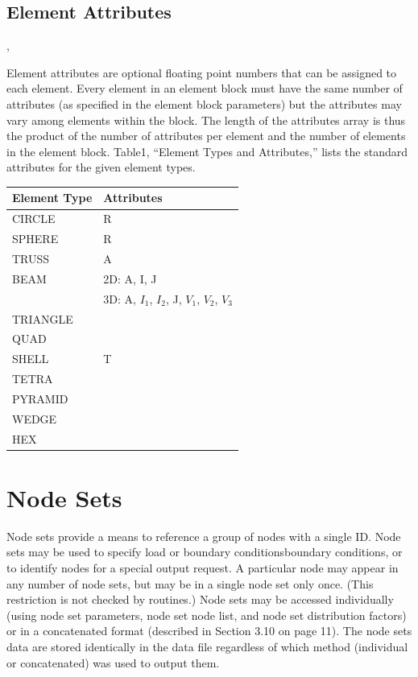 \subsection{Element Attributes}

\begin{spacing}{1.5}
\api {}, 
\end{spacing}

{Element attributes are optional floating point numbers that can be
assigned to each element. Every element in an element block must have
the same number of attributes (as specified in the element block
parameters) but the attributes may vary among elements within the
block. The length of the attributes array is thus the product of the
number of attributes per element and the number of elements in the
element block.  Table{\nobreakspace}1, ``Element Types and
Attributes,'' lists the standard attributes for the given element
types. }

\begin{table}[htbp]
\begin{center}
\begin{tabular}{|l|l|} \hline
Element Type & Attributes \\ \hline
CIRCLE   & R \\ \hline
SPHERE   & R \\ \hline
TRUSS    & A \\ \hline
BEAM     & 2D: A, I, J \\
         & 3D: A, $I_1$, $I_2$, J, $V_1$, $V_2$, $V_3$ \\ \hline
TRIANGLE & \\ \hline
QUAD     & \\ \hline
SHELL    & T \\ \hline
TETRA    & \\ \hline
PYRAMID  & \\ \hline
WEDGE    & \\ \hline
HEX      & \\ \hline
\end{tabular}
\end{center}
\end{table}

\section{Node Sets}

Node sets provide a means to reference a group of nodes with a single
ID. Node sets may be used to specify load or boundary
conditionsboundary conditions, or to identify nodes for a special
output request. A particular node may appear in any number of node
sets, but may be in a single node set only once. (This restriction is
not checked by \exo{} routines.) Node sets may be accessed
individually (using node set parameters, node set node list, and node
set distribution factors) or in a concatenated format (described in
Section 3.10 on page 11). The node sets data are stored identically in
the data file regardless of which method (individual or concatenated)
was used to output them.

